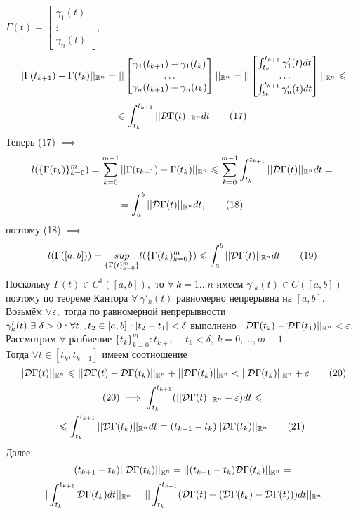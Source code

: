 \documentclass[main]{subfiles}
\begin{document}
\begin{longProof}
 \( \Gamma(t)=\begin{bmatrix}\gamma_1(t)\\\vdots\\\gamma_n(t) \end{bmatrix}, \)
\[ || \Gamma(t_{k+1})-\Gamma(t_k)||_{\mathbb{R}^n}=||\begin{bmatrix}\gamma_1(t_{k+1})-\gamma_1(t_k)\\\dots\\\gamma_n(t_{k+1})-
    \gamma_n(t_k) \end{bmatrix}||_{\mathbb{R}^n}=||\begin{bmatrix}\int_{t_{k}}^{t_{k+1}}\gamma_1'(t)dt\\\dots\\
        \int_{t_{k}}^{t_{k+1}}\gamma_n'(t)dt \end{bmatrix}||_{\mathbb{R}^n}\leqslant\]\[\leqslant \int_{t_k}^{t_{k+1}}||\mathcal{D} \Gamma(t)||_{\mathbb{R}^n} dt\tag{17} \]
Теперь (17) $\implies$ \[ l(\{ \Gamma(t_k)\}_{k=0}^m)=\sum_{k=0}^{m-1}||\Gamma(t_{k+1})-\Gamma(t_k)||_{\mathbb{R}^n}\leqslant \sum\limits_{k=0}^{m-1}\int_{t_k}^{t_{k+1}}||\mathcal{D}\Gamma(t)||_{\mathbb{R}^n} dt=\]\[=\int_a^b||\mathcal{D}\Gamma(t)||_{\mathbb{R}^n} dt,\tag{18} \]
поэтому (18) $\implies$
\[ l(\Gamma([a,b]))=\underset{\{\Gamma(t)_{k=0}^m\}}{sup} l(\{\Gamma(t_k)_{k=0}^m\})\leqslant \int_a^b||\mathcal{D}\Gamma(t)||_{\mathbb{R}^n} dt\tag{19} \]
Поскольку $\Gamma(t)\in C^1([a,b]),$ то $\forall\ k=1\dots n$ имеем $\gamma'_k(t)\in C([a,b])$ поэтому по теореме Кантора $\forall\ \gamma'_k(t)$ равномерно непрерывна на $[a,b].$\\ Возьмём $\forall\varepsilon,$ тогда по равномерной непрерывности $\gamma_k'(t)\ \exists\ \delta>0:\\ \forall t_1, t_2\in[a,b]: |t_2-t_1|<\delta$ выполнено $||\mathcal{D}\Gamma(t_2)-\mathcal{D}\Gamma(t_1)||_{\mathbb{R}^n}<\varepsilon.$\\
Рассмотрим $\forall$ разбиение $\{ t_k\}^m_{k=0}: t_{k+1}-t_k<\delta,\ k=0,\dots,m-1.$\\
Тогда $\forall t\in [t_k,t_{k+1}]$ имеем соотношение 
\[ ||\D\Gamma(t)||_{\vR^n}\leq||\D\Gamma(t)-\D\Gamma(t_k)||_{\vR^n}+||\D\Gamma(t_k)||_{\vR^n}<||\D\Gamma(t_k)||_{\vR^n}+\varepsilon\tag{20} \]
\begin{multline*}
    (20)\implies \int_{t_k}^{t_{k+1}}(||\mathcal{D}\Gamma(t)||_{\mathbb{R}^n}-\varepsilon)dt\leqslant \\ 
    \leqslant \int_{t_k}^{t_{k+1}}||\mathcal{D}\Gamma(t_k)||_{\mathbb{R}^n} dt=(t_{k+1}-t_k)||\mathcal{D}\Gamma(t_k)||_{\mathbb{R}^n}\tag{21}
\end{multline*}
Далее, \[ (t_{k+1}-t_k)||\mathcal{D}\Gamma(t_k)||_{\mathbb{R}^n}=||(t_{k+1}-t_k)\mathcal{D}\Gamma(t_k)||_{\mathbb{R}^n}= \]
\[ =||\int_{t_k}^{t_{k+1}}\mathcal{D}\Gamma(t_k)dt||_{\mathbb{R}^n}=||\int_{t_k}^{t_{k+1}}(\mathcal{D}\Gamma(t)+(\mathcal{D}\Gamma(t_k)-\mathcal{D}\Gamma(t)))dt||_{\mathbb{R}^n}= \]

\end{longProof}
\end{document}
